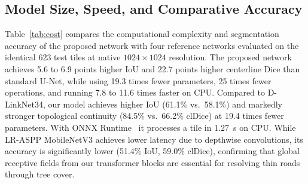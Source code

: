 \documentclass{ieeeaccess}
\begin{document}
\subsection{Model Size, Speed, and Comparative Accuracy}

Table~\ref{tab:cost} compares the computational complexity and segmentation accuracy of the proposed network with four reference networks evaluated on the identical 623 test tiles at native $1024 \times 1024$ resolution. The proposed network achieves 5.6 to 6.9 points higher IoU and 22.7 points higher centerline Dice than standard U-Net, while using 19.3 times fewer parameters, 25 times fewer operations, and running 7.8 to 11.6 times faster on CPU. Compared to D-LinkNet34, our model achieves higher IoU (61.1\% vs.\ 58.1\%) and markedly stronger topological continuity (84.5\% vs.\ 66.2\% clDice) at 19.4 times fewer parameters. With ONNX Runtime~\cite{onnxruntime} it processes a tile in 1.27~s on CPU. While LR-ASPP MobileNetV3 achieves lower latency due to depthwise convolutions, its accuracy is significantly lower (51.4\% IoU, 59.0\% clDice), confirming that global receptive fields from our transformer blocks are essential for resolving thin roads through tree cover.
\end{document}
